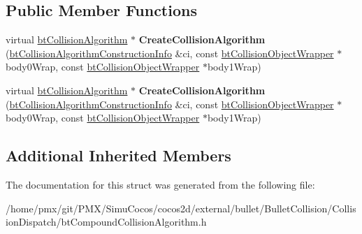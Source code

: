 \subsection*{Public Member Functions}
\begin{DoxyCompactItemize}
\item 
\mbox{\label{structbtCompoundCollisionAlgorithm_1_1CreateFunc_ace3507575919730b70f4f8d392cd1369}} 
virtual \hyperlink{classbtCollisionAlgorithm}{bt\+Collision\+Algorithm} $\ast$ {\bfseries Create\+Collision\+Algorithm} (\hyperlink{structbtCollisionAlgorithmConstructionInfo}{bt\+Collision\+Algorithm\+Construction\+Info} \&ci, const \hyperlink{structbtCollisionObjectWrapper}{bt\+Collision\+Object\+Wrapper} $\ast$body0\+Wrap, const \hyperlink{structbtCollisionObjectWrapper}{bt\+Collision\+Object\+Wrapper} $\ast$body1\+Wrap)
\item 
\mbox{\label{structbtCompoundCollisionAlgorithm_1_1CreateFunc_ace3507575919730b70f4f8d392cd1369}} 
virtual \hyperlink{classbtCollisionAlgorithm}{bt\+Collision\+Algorithm} $\ast$ {\bfseries Create\+Collision\+Algorithm} (\hyperlink{structbtCollisionAlgorithmConstructionInfo}{bt\+Collision\+Algorithm\+Construction\+Info} \&ci, const \hyperlink{structbtCollisionObjectWrapper}{bt\+Collision\+Object\+Wrapper} $\ast$body0\+Wrap, const \hyperlink{structbtCollisionObjectWrapper}{bt\+Collision\+Object\+Wrapper} $\ast$body1\+Wrap)
\end{DoxyCompactItemize}
\subsection*{Additional Inherited Members}


The documentation for this struct was generated from the following file\+:\begin{DoxyCompactItemize}
\item 
/home/pmx/git/\+P\+M\+X/\+Simu\+Cocos/cocos2d/external/bullet/\+Bullet\+Collision/\+Collision\+Dispatch/bt\+Compound\+Collision\+Algorithm.\+h\end{DoxyCompactItemize}
